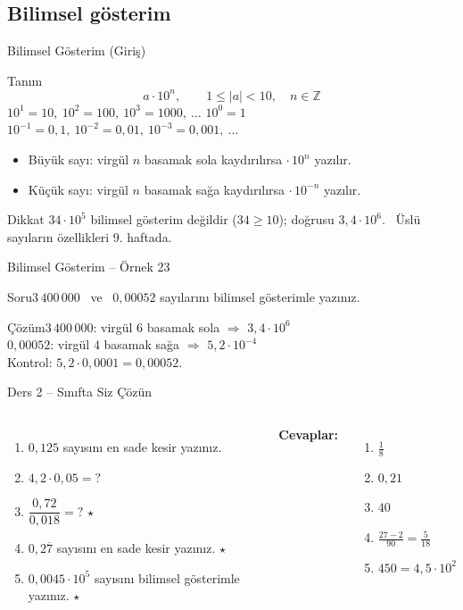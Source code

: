 \documentclass[aspectratio=169,11pt,handout]{beamer}
\newcommand{\soru}[3]{%
\begin{frame}{#1}
  \begin{block}{Soru}\large #2\end{block}
  \pause
  \begin{exampleblock}{Çözüm}\large #3\end{exampleblock}
\end{frame}}
\newcommand{\ab}[1]{\overline{#1}}
\begin{document}
\subsection{Bilimsel gösterim}
\begin{frame}{Bilimsel Gösterim (Giriş)}
\begin{block}{Tanım}
\[a\cdot 10^{n},\qquad 1\le |a|<10,\quad n\in\mathbb{Z}\]
\(10^{1}=10,\ 10^{2}=100,\ 10^{3}=1000,\ \dots\) \qquad \(10^{0}=1\) \qquad \(10^{-1}=0{,}1,\ 10^{-2}=0{,}01,\ 10^{-3}=0{,}001,\ \dots\)
\begin{itemize}
\item Büyük sayı: virgül \(n\) basamak sola kaydırılırsa \(\cdot\,10^{n}\) yazılır.
\item Küçük sayı: virgül \(n\) basamak sağa kaydırılırsa \(\cdot\,10^{-n}\) yazılır.
\end{itemize}
\end{block}
\begin{alertblock}{Dikkat}
\(34\cdot 10^{5}\) bilimsel gösterim değildir (\(34\ge 10\)); doğrusu \(3{,}4\cdot 10^{6}\). \ Üslü sayıların özellikleri 9. haftada.
\end{alertblock}
\end{frame}

\soru{Bilimsel Gösterim -- Örnek 23}
{\(3\,400\,000\) \ ve \ \(0{,}00052\) sayılarını bilimsel gösterimle yazınız.}
{\(3\,400\,000\): virgül \(6\) basamak sola \(\Rightarrow\) \(3{,}4\cdot 10^{6}\)\\[4pt]
\(0{,}00052\): virgül \(4\) basamak sağa \(\Rightarrow\) \(5{,}2\cdot 10^{-4}\)\\[4pt]
Kontrol: \(5{,}2\cdot 0{,}0001=0{,}00052\).}

\begin{frame}{Ders 2 -- Sınıfta Siz Çözün}
\begin{columns}[t]
\begin{enumerate}
\item \(0{,}125\) sayısını en sade kesir yazınız.
\item \(4{,}2\cdot 0{,}05=?\)
\item \(\dfrac{0{,}72}{0{,}018}=?\) \(\star\)
\item \(0{,}2\ab{7}\) sayısını en sade kesir yazınız. \(\star\)
\item \(0{,}0045\cdot 10^{5}\) sayısını bilimsel gösterimle yazınız. \(\star\)
\end{enumerate}
\pause
\textbf{Cevaplar:}
\begin{enumerate}
\item \(\frac{1}{8}\)
\item \(0{,}21\)
\item \(40\)
\item \(\frac{27-2}{90}=\frac{5}{18}\)
\item \(450=4{,}5\cdot 10^{2}\)
\end{enumerate}
\end{columns}
\vspace{4pt}{\footnotesize \(\star\) işaretli soruların adım adım çözümü sonraki slaytlardadır.}
\end{frame}
\end{document}
